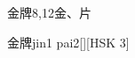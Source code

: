 \begin{entry}{金牌}{8,12}{⾦、⽚}
  \begin{phonetics}{金牌}{jin1 pai2}[][HSK 3]
  \end{phonetics}
\end{entry}
